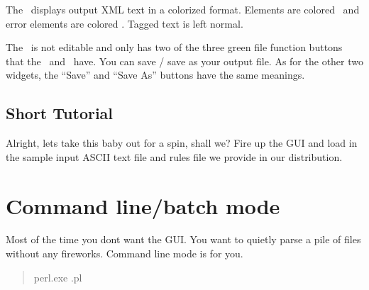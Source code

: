 The \outputtextarea\ displays output XML text in a colorized format.
Elements are colored \outputelementcolor\ and error elements are
colored \outputerrorcolor . Tagged text is left normal.

The \outputtextarea\ is not editable and only has two of the three
green file function buttons that the \ and 
\ have. You can save / save as your output file.
As for the other two widgets, the ``Save'' and ``Save As'' buttons 
have the same meanings.

\subsection{Short Tutorial}
\label{sec:guitutorial}

Alright, lets take this baby out for a spin, shall we?
Fire up the GUI and load in the sample input ASCII text file and 
rules file we provide in our distribution.

\section{Command line/batch mode} 
\label{sec:commandline}

Most of the time you dont want the GUI. You want to quietly parse
a pile of files without any fireworks. Command line mode is for you.

\begin{quote}
perl.exe \program .pl 
\end{quote}



